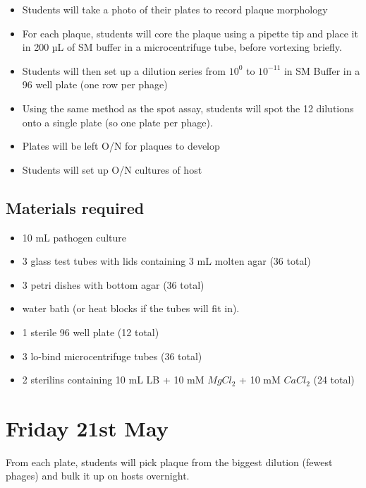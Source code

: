 \documentclass[
]{book}
\providecommand{\tightlist}{%
  \setlength{\itemsep}{0pt}\setlength{\parskip}{0pt}}
\begin{document}
\begin{itemize}
\tightlist
\item
  Students will take a photo of their plates to record plaque morphology
\item
  For each plaque, students will core the plaque using a pipette tip and place it in 200 µL of SM buffer in a microcentrifuge tube, before vortexing briefly.
\item
  Students will then set up a dilution series from \(10^{0}\) to \(10^{-11}\) in SM Buffer in a 96 well plate (one row per phage)
\item
  Using the same method as the spot assay, students will spot the 12 dilutions onto a single plate (so one plate per phage).
\item
  Plates will be left O/N for plaques to develop
\item
  Students will set up O/N cultures of host
\end{itemize}

\hypertarget{materials-required-3}{%
\subsection{Materials required}\label{materials-required-3}}

\begin{itemize}
\tightlist
\item
  10 mL pathogen culture
\item
  3 glass test tubes with lids containing 3 mL molten agar (36 total)
\item
  3 petri dishes with bottom agar (36 total)
\item
  water bath (or heat blocks if the tubes will fit in).
\item
  1 sterile 96 well plate (12 total)
\item
  3 lo-bind microcentrifuge tubes (36 total)
\item
  2 sterilins containing 10 mL LB + 10 mM \(MgCl_{2}\) + 10 mM \(CaCl_{2}\) (24 total)
\end{itemize}

\hypertarget{friday-21st-may}{%
\section{Friday 21st May}\label{friday-21st-may}}

From each plate, students will pick plaque from the biggest dilution (fewest phages) and bulk it up on hosts overnight.
\end{document}
